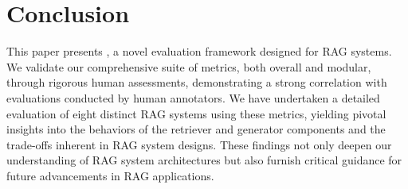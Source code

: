 \section{Conclusion}
This paper presents \benchname\space, a novel evaluation framework designed for RAG systems.
We validate our comprehensive suite of metrics, both overall and modular, through rigorous human assessments, demonstrating a strong correlation with evaluations conducted by human annotators. We have undertaken a detailed evaluation of eight distinct RAG systems using these metrics, yielding pivotal insights into the behaviors of the retriever and generator components and the trade-offs inherent in RAG system designs. These findings not only deepen our understanding of RAG system architectures but also furnish critical guidance for future advancements in RAG applications.